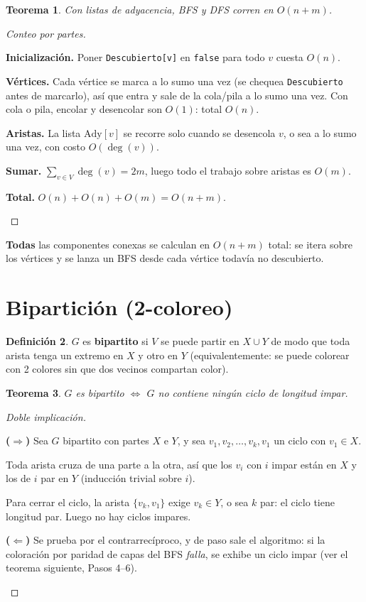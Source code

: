 \documentclass[11pt,a4paper]{article}
\theoremstyle{plain}
\newtheorem{teorema}{Teorema}[section]
\theoremstyle{definition}
\newtheorem{definicion}[teorema]{Definición}
\theoremstyle{remark}
\begin{document}
\begin{teorema}
Con listas de adyacencia, BFS y DFS corren en $O(n+m)$.
\end{teorema}
\begin{proof}[Conteo por partes]
\begin{pasos}
\item \textbf{Inicialización.} Poner \texttt{Descubierto[v]} en \texttt{false} para todo
$v$ cuesta $O(n)$.
\item \textbf{Vértices.} Cada vértice se marca a lo sumo una vez (se chequea
\texttt{Descubierto} antes de marcarlo), así que entra y sale de la cola/pila a lo sumo
una vez. Con cola o pila, encolar y desencolar son $O(1)$: total $O(n)$.
\item \textbf{Aristas.} La lista $\mathrm{Ady}[v]$ se recorre solo cuando se desencola
$v$, o sea a lo sumo una vez, con costo $O(\deg(v))$.
\item \textbf{Sumar.} $\sum_{v\in V}\deg(v)=2m$, luego todo el trabajo sobre aristas es
$O(m)$.
\item \textbf{Total.} $O(n)+O(n)+O(m)=O(n+m)$. \qedhere
\end{pasos}
\end{proof}

\noindent \textbf{Todas} las componentes conexas se calculan en $O(n+m)$ total: se
itera sobre los vértices y se lanza un BFS desde cada vértice todavía no descubierto.

\section{Bipartición (2-coloreo)}

\begin{definicion}
$G$ es \textbf{bipartito} si $V$ se puede partir en $X\cup Y$ de modo que toda arista
tenga un extremo en $X$ y otro en $Y$ (equivalentemente: se puede colorear con 2
colores sin que dos vecinos compartan color).
\end{definicion}

\begin{teorema}
$G$ es bipartito $\iff$ $G$ no contiene ningún ciclo de longitud impar.
\end{teorema}
\begin{proof}[Doble implicación]
\begin{pasos}
\item \textbf{($\Rightarrow$)} Sea $G$ bipartito con partes $X$ e $Y$, y sea
$v_1,v_2,\dots,v_k,v_1$ un ciclo con $v_1\in X$.
\item Toda arista cruza de una parte a la otra, así que los $v_i$ con $i$ impar están en
$X$ y los de $i$ par en $Y$ (inducción trivial sobre $i$).
\item Para cerrar el ciclo, la arista $\{v_k,v_1\}$ exige $v_k\in Y$, o sea $k$ par: el
ciclo tiene longitud par. Luego no hay ciclos impares.
\item \textbf{($\Leftarrow$)} Se prueba por el contrarrecíproco, y de paso sale el
algoritmo: si la coloración por paridad de capas del BFS \emph{falla}, se exhibe un
ciclo impar (ver el teorema siguiente, Pasos 4--6). \qedhere
\end{pasos}
\end{proof}
\end{document}
